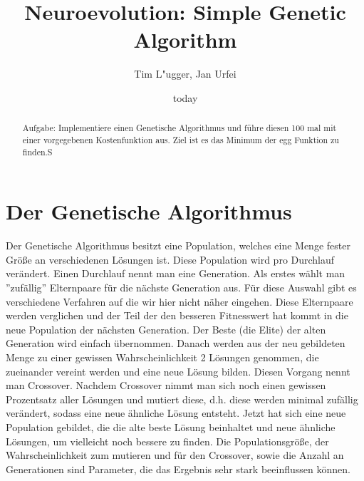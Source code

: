 \documentclass{hbrs-ecta-report}
\begin{document}

\title{Neuroevolution: Simple Genetic Algorithm}
\subtitle{}

\author{
\alignauthor
Tim L"ugger, Jan Urfei
}

\date{today}
\maketitle
\begin{abstract}
Aufgabe: Implementiere einen Genetische Algorithmus und führe diesen 100 mal mit einer vorgegebenen Kostenfunktion aus. Ziel ist es das Minimum der egg Funktion zu finden.S	
\end{abstract}

\section{Der Genetische Algorithmus}
Der Genetische Algorithmus besitzt eine Population, welches eine Menge fester Größe an verschiedenen Lösungen ist. Diese Population wird pro Durchlauf verändert. Einen Durchlauf nennt man eine Generation. 
\newline \newline
Als erstes wählt man ''zufällig'' Elternpaare für die nächste Generation aus. Für diese Auswahl gibt es verschiedene Verfahren auf die wir hier nicht näher eingehen. Diese Elternpaare werden verglichen und der Teil der den besseren Fitnesswert hat kommt in die neue Population der nächsten Generation. Der Beste (die Elite) der alten Generation wird einfach übernommen.
\newline \newline
Danach werden aus der neu gebildeten Menge zu einer gewissen Wahrscheinlichkeit  2 Lösungen genommen, die zueinander vereint werden und eine neue Lösung bilden. Diesen Vorgang nennt man Crossover.
\newline \newline
Nachdem Crossover nimmt man sich noch einen gewissen Prozentsatz aller Lösungen und mutiert diese, d.h. diese werden minimal zufällig verändert, sodass eine neue ähnliche Lösung entsteht.
\newline \newline
Jetzt  hat sich eine neue Population gebildet, die die alte beste Lösung beinhaltet und neue ähnliche Lösungen, um vielleicht noch bessere zu finden. Die Populationsgröße, der Wahrscheinlichkeit zum mutieren und für den Crossover, sowie die Anzahl an Generationen sind Parameter, die das Ergebnis sehr stark beeinflussen können.
\end{document}
